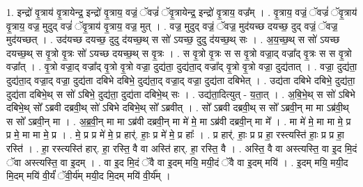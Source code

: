 \documentclass[17pt]{extarticle}
\begin{document}
1. इन्द्रो॑ वृ॒त्राय॑ वृ॒त्रायेन्द्र॒ इन्द्रो॑ वृ॒त्राय॒ वज्रं॒ ॅवज्रं॑ ॅवृ॒त्रायेन्द्र॒ इन्द्रो॑ वृ॒त्राय॒ वज्र᳚म् । . वृ॒त्राय॒ वज्रं॒ ॅवज्रं॑ ॅवृ॒त्राय॑ वृ॒त्राय॒ वज्र॒ मुदुद् वज्रं॑ ॅवृ॒त्राय॑ वृ॒त्राय॒ वज्र॒ मुत् । . वज्र॒ मुदुद् वज्रं॒ ॅवज्र॒ मुद॑यच्छ दयच्छ॒ दुद् वज्रं॒ ॅवज्र॒ मुद॑यच्छत् । . उद॑यच्छ दयच्छ॒ दुदु द॑यच्छ॒थ् स सो॑ ऽयच्छ॒ दुदु द॑यच्छ॒थ् सः । . अ॒य॒च्छ॒थ् स सो॑ ऽयच्छ दयच्छ॒थ् स वृ॒त्रो वृ॒त्रः सो॑ ऽयच्छ दयच्छ॒थ् स वृ॒त्रः । . स वृ॒त्रो वृ॒त्रः स स वृ॒त्रो वज्रा॒द् वज्रा᳚द् वृ॒त्रः स स वृ॒त्रो वज्रा᳚त् । . वृ॒त्रो वज्रा॒द् वज्रा᳚द् वृ॒त्रो वृ॒त्रो वज्रा॒ दुद्य॑ता॒ दुद्य॑ता॒द् वज्रा᳚द् वृ॒त्रो वृ॒त्रो वज्रा॒ दुद्य॑तात् । . वज्रा॒ दुद्य॑ता॒ दुद्य॑ता॒द् वज्रा॒द् वज्रा॒ दुद्य॑ता दबिभे दबिभे॒ दुद्य॑ता॒द् वज्रा॒द् वज्रा॒ दुद्य॑ता दबिभेत् । . उद्य॑ता दबिभे दबिभे॒ दुद्य॑ता॒ दुद्य॑ता दबिभे॒थ् स सो॑ ऽबिभे॒ दुद्य॑ता॒ दुद्य॑ता दबिभे॒थ् सः । . उद्य॑ता॒दित्युत् - य॒ता॒त् । . अ॒बि॒भे॒थ् स सो॑ ऽबिभे दबिभे॒थ् सो᳚ ऽब्रवी दब्रवी॒थ् सो॑ ऽबिभे दबिभे॒थ् सो᳚ ऽब्रवीत् । . सो᳚ ऽब्रवी दब्रवी॒थ् स सो᳚ ऽब्रवी॒न् मा मा ऽब्र॑वी॒थ् स सो᳚ ऽब्रवी॒न् मा । . अ॒ब्र॒वी॒न् मा मा ऽब्र॑वी दब्रवी॒न् मा मे॑ मे॒ मा ऽब्र॑वी दब्रवी॒न् मा मे᳚ । . मा मे॑ मे॒ मा मा मे॒ प्र प्र मे॒ मा मा मे॒ प्र । . मे॒ प्र प्र मे॑ मे॒ प्र हार्॑. हाः॒ प्र मे॑ मे॒ प्र हाः᳚ । . प्र हार्॑. हाः॒ प्र प्र हा॒ रस्त्यस्ति॑ हाः॒ प्र प्र हा॒ रस्ति॑ । . हा॒ रस्त्यस्ति॑ हार्. हा॒ रस्ति॒ वै वा अस्ति॑ हार्. हा॒ रस्ति॒ वै । . अस्ति॒ वै वा अस्त्यस्ति॒ वा इ॒द मि॒दं ॅवा अस्त्यस्ति॒ वा इ॒दम् । . वा इ॒द मि॒दं ॅवै वा इ॒दम् मयि॒ मयी॒दं ॅवै वा इ॒दम् मयि॑ । . इ॒दम् मयि॒ मयी॒द मि॒दम् मयि॑ वी॒र्यं॑ ॅवी॒र्य॑म् मयी॒द मि॒दम् मयि॑ वी॒र्य᳚म् । \newline
\end{document}
